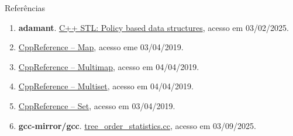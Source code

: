 \begin{frame}[fragile]{Referências}

    \begin{enumerate}
        \item \textbf{adamant}. \href{https://codeforces.com/blog/entry/11080}{C++ STL: Policy based data structures}, acesso em 03/02/2025.

        \item \href{https://en.cppreference.com/w/cpp/container/map}{CppReference -- Map}, acesso eme 03/04/2019.

        \item \href{https://en.cppreference.com/w/cpp/container/multimap}{CppReference -- Multimap}, acesso em 04/04/2019.

        \item \href{https://en.cppreference.com/w/cpp/container/multiset}{CppReference -- Multiset}, acesso em 04/04/2019.

        \item \href{https://en.cppreference.com/w/cpp/container/set}{CppReference -- Set}, acesso em 03/04/2019.

        \item \textbf{gcc-mirror/gcc}. \href{https://github.com/gcc-mirror/gcc/blob/master/libstdc%2B%2B-v3/testsuite/ext/pb_ds/example/tree_order_statistics.cc}{tree\_order\_statistics.cc}, acesso em 03/09/2025.
    \end{enumerate}

\end{frame}
